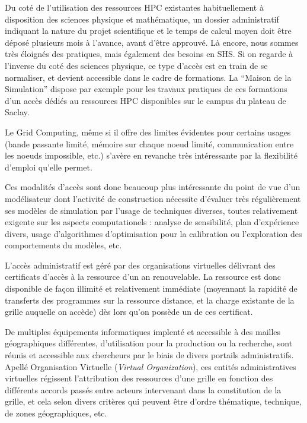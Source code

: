 Du coté de l'utilisation des ressources HPC existantes habituellement à disposition des sciences physique et mathématique, un dossier administratif indiquant la nature du projet scientifique et le temps de calcul moyen doit être déposé plusieurs mois à l'avance, avant d'être approuvé. Là encore, nous sommes très éloignés des pratiques, mais également des besoins en SHS. 
Si on regarde à l'inverse du coté des sciences physique, ce type d'accès est en train de se normaliser, et devient accessible dans le cadre de formations. La \enquote{Maison de la Simulation} dispose par exemple pour les travaux pratiques de ces formations d'un accès dédiés au ressources HPC disponibles sur le campus du plateau de Saclay. 

Le Grid Computing, même si il offre des limites évidentes pour certains usages (bande passante limité, mémoire sur chaque noeud limité, communication entre les noeuds impossible, etc.) s'avère en revanche très intéressante par la flexibilité d'emploi qu'elle permet.

Ces modalités d'accès sont donc beaucoup plus intéressante du point de vue d'un modélisateur dont l'activité de construction nécessite d'évaluer très régulièrement ses modèles de simulation par l'usage de techniques diverses, toutes relativement exigente sur les aspects computationels : analyse de sensibilité, plan d'expérience divers, usage d'algorithmes d'optimisation pour la calibration ou l'exploration des comportements du modèles, etc. 

L'accès administratif est géré par des organisations virtuelles délivrant des certificats d'accès à la ressource d'un an renouvelable. La ressource est donc disponible de façon illimité et relativement immédiate (moyennant la rapidité de transferts des programmes sur la ressource distance, et la charge existante de la grille auquelle on accède) dès lors qu'on possède un de ces certificat. 

De multiples équipements informatiques implenté et accessible à des mailles géographiques différentes, d'utilisation pour la production ou la recherche, sont réunis et accessible aux chercheurs par le biais de divers portails administratifs. Apellé Organisation Virtuelle (\textit{Virtual Organization}), ces entités administratives virtuelles régissent l'attribution des ressources d'une grille en fonction des différents accords passés entre acteurs intervenant dans la constitution de la grille, et cela selon divers critères qui peuvent être d'ordre thématique, technique, de zones géographiques, etc.

